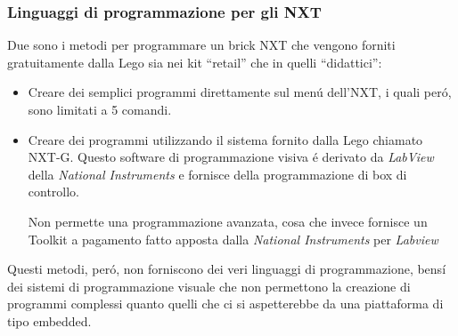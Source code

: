 \subsubsection{Linguaggi di programmazione per gli NXT}
Due sono i metodi per programmare un brick NXT che vengono forniti
gratuitamente dalla Lego sia nei kit ``retail'' che in quelli
``didattici'':
\begin{itemize}
    \item Creare dei semplici programmi direttamente sul men\'u
        dell'NXT, i quali per\'o, sono limitati a 5 comandi.
    \item Creare dei programmi utilizzando il sistema fornito dalla Lego
        chiamato NXT-G. Questo software di programmazione visiva \'e
        derivato da \emph{LabView} della \emph{National Instruments} e
        fornisce della programmazione di box di controllo.

        Non permette una programmazione avanzata, cosa che invece fornisce
        un Toolkit a pagamento fatto apposta dalla \emph{National
        Instruments} per \emph{Labview}
\end{itemize}

Questi metodi, per\'o, non forniscono dei veri linguaggi di programmazione,
bens\'i dei sistemi di programmazione visuale che non permettono la
creazione di programmi complessi quanto quelli che ci si aspetterebbe da
una piattaforma di tipo embedded.

